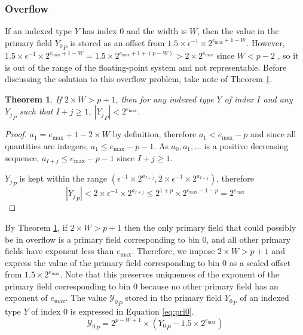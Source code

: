 \documentclass[12pt]{article}
\providecommand{\max}{\ensuremath{\text{max}}}
\theoremstyle{plain}
\newtheorem{thm}{Theorem}[section]
\numberwithin{equation}{section}
\begin{document}
    \subsubsection{Overflow}
      \label{sec:indexed_implementation_overflow}
      If an indexed type $Y$ has index 0 and the width is $W$, then the value in the primary field ${Y_0}_P$ is stored as an offset from $1.5\times\epsilon^{-1}\times2^{e_{\max} + 1 - W}$. However, $1.5\times\epsilon^{-1}\times2^{e_{\max} + 1 - W} = 1.5 \times 2^{e_{\max} + 1 + (p - W)} > 2 \times 2^{e_{\max}}$ since $W < p - 2$ \cite{repsum}, so it is out of the range of the floating-point system and not representable. Before discussing the solution to this overflow problem, take note of Theorem \ref{thm:overflow}.
      \begin{thm}
        If $2\times W > p + 1$, then for any indexed type $Y$ of index $I$ and any ${Y_j}_P$ such that $I + j \geq 1$, $|{Y_j}_P| < 2^{e_{\max}}$.
        \label{thm:overflow}
      \end{thm}
      \begin{proof}
        $a_1 = e_{\max} + 1 - 2\times W$ by definition, therefore $a_1 < e_{\max} - p$ and since all quantities are integers, $a_1 \leq e_{\max} - p - 1$. As $a_0, a_1, ...$ is a positive decreasing sequence, $a_{I + j} \leq e_{\max} - p - 1$ since $I + j \geq 1$.

        ${Y_j}_P$ is kept within the range $(\epsilon^{-1} \times 2^{a_{I + j}}, 2 \times \epsilon^{-1} \times 2^{a_{I + j}})$, therefore
        \begin{equation*}
          |{Y_j}_P| < 2 \times \epsilon^{-1} \times 2^{a_{I + j}} \leq 2^{1 + p} \times 2^{e_{\max} - 1 - p} = 2^{e_{\max}}
        \end{equation*}
      \end{proof}
      By Theorem \ref{thm:overflow}, if $2\times W > p + 1$ then the only primary field that could possibly be in overflow is a primary field corresponding to bin 0, and all other primary fields have exponent less than $e_{\max}$. Therefore, we impose $2\times W > p + 1$ and express the value of the primary field corresponding to bin 0 as a scaled offset from $1.5\times2^{e_{\max}}$. Note that this preserves uniqueness of the exponent of the primary field corresponding to bin 0 because no other primary field has an exponent of $e_{\max}$. The value ${\mathcal{Y}_0}_P$ stored in the primary field ${Y_0}_P$ of an indexed type $Y$ of index 0 is expressed in Equation \ref{eq:pri0}.
      \begin{equation}
        {\mathcal{Y}_0}_P = 2^{p - W + 1}\times({Y_0}_P - 1.5\times2^{e_{\max}})
        \label{eq:pri0}
      \end{equation}
\end{document}
